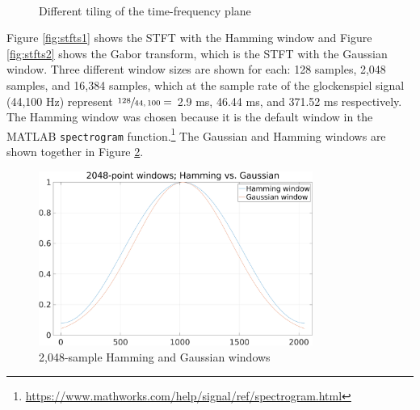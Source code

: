 \documentclass[report.tex]{subfiles}
\begin{document}
\begin{figure}[ht]
	\centering
	\\
	\caption{Different tiling of the time-frequency plane \parencite[326, 327]{gabordiagrams}}
	\label{fig:gabortf}
\end{figure}

Figure \ref{fig:stfts1} shows the STFT with the Hamming window and Figure \ref{fig:stfts2} shows the Gabor transform, which is the STFT with the Gaussian window. Three different window sizes are shown for each: 128 samples, 2,048 samples, and 16,384 samples, which at the sample rate of the glockenspiel signal (44,100 Hz) represent $\sfrac{128}{44,100} =$ 2.9 ms, 46.44 ms, and 371.52 ms respectively. The Hamming window was chosen because it is the default window in the MATLAB \Verb#spectrogram# function.\footnote{\url{https://www.mathworks.com/help/signal/ref/spectrogram.html}} The Gaussian and Hamming windows are shown together in Figure \ref{fig:gaussvshamm}.

\begin{figure}[ht]
	\centering
	\includegraphics[width=0.8\textwidth]{./images-tftheory/hamming_vs_gauss.png}
	\caption{2,048-sample Hamming and Gaussian windows}
	\label{fig:gaussvshamm}
\end{figure}
\end{document}
